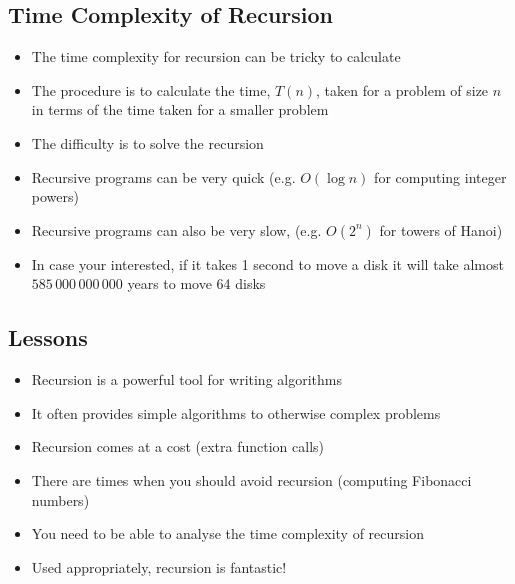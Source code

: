 \begin{slide}
\section[-1]{Time Complexity of Recursion}

\begin{PauseHighLight}
  \begin{itemize}
  \item The time complexity for recursion can be tricky to
    calculate\pause
  \item The procedure is to calculate the time, $T(n)$, taken for a
    problem of size $n$ in terms of the time taken for a smaller
    problem\pause
  \item The difficulty is to solve the recursion\pause
  \item Recursive programs can be very quick (e.g. $O(\log n)$ for
    computing integer powers)\pause
  \item Recursive programs can also be very slow, (e.g. $O(2^n)$ for
    towers of Hanoi)\pause
  \item In case your interested, if it takes 1 second to move a disk it
    will take almost $585\,000\,000\,000$ years to move 64 disks\pauseb
  \end{itemize}
\end{PauseHighLight}

\end{slide}



\begin{slide}
\section[-1]{Lessons}

\begin{PauseHighLight}
  \begin{itemize}
  \item Recursion is a powerful tool for writing algorithms\pause
  \item It often provides simple algorithms to otherwise complex
    problems\pause
  \item Recursion comes at a cost (extra function calls)\pause
  \item There are times when you should avoid recursion (computing
    Fibonacci numbers)\pause
  \item You need to be able to analyse the time complexity of
    recursion\pause
  \item Used appropriately, recursion is fantastic!\pause
  \end{itemize}
\end{PauseHighLight}
\end{slide}
